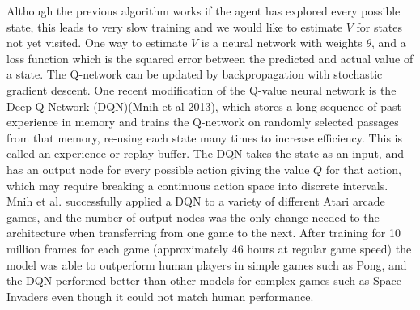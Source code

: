 \documentclass[journal,onecolumn]{IEEEtran}
\begin{document}
Although the previous algorithm works if the agent has explored every possible state, this leads to very slow training and we would like to estimate $V$ for states not yet visited.  One way to estimate $V$ is a neural network with weights $\theta$, and a loss function which is the squared error between the predicted and actual value of a state.  The Q-network can be updated by backpropagation with stochastic gradient descent.  One recent modification of the Q-value neural network is the Deep Q-Network (DQN)(Mnih et al 2013), which stores a long sequence of past experience in memory and trains the Q-network on randomly selected passages from that memory, re-using each state many times to increase efficiency. This is called an experience or replay buffer. The DQN takes the state as an input, and has an output node for every possible action giving the value $Q$ for that action, which may require breaking a continuous action space into discrete intervals.  Mnih et al. successfully applied a DQN to a variety of different Atari arcade games, and the number of output nodes was the only change needed to the architecture when transferring from one game to the next.  After training for 10 million frames for each game (approximately 46 hours at regular game speed) the model was able to outperform human players in simple games such as Pong, and the DQN performed better than other models for complex games such as Space Invaders even though it could not match human performance.
\end{document}
